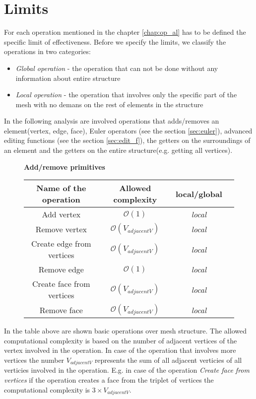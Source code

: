 \section{Limits}

For each operation mentioned in the chapter \ref{chap:op_al} has to be defined the specific limit
of effectiveness. Before we specify the limits, we classify the operations in two categories:

\begin{itemize}
\item \emph{Global operation} - the operation that can not be done without any information
about entire structure
\item \emph{Local operation} - the operation that involves only the specific part of the mesh
with no demans on the rest of elements in the structure
\end{itemize}
In the following analysis are involved operations that adds/removes an element(vertex, edge, face),
Euler operators (see the section \ref{sec:euler}), advanced editing functions (see the
section \ref{sec:edit_f}),
the getters on the surroundings of an element and the getters
on the entire structure(e.g. getting all vertices).

\begin{figure}[!hbf]

\centering
\textbf{Add/remove primitives}\\
\label{fig:comp_prim}
\vspace{2mm}
\begin{tabular}{| c | c | c | c |}
\hline
\textbf{Name of the operation} & \textbf{Allowed complexity} & \textbf{local/global}\\
\hline
Add vertex & $\mathcal{O}(1)$ & \emph{local}\\
\hline
Remove vertex & $\mathcal{O}(V_{adjacentV})$ & \emph{local}\\
\hline
Create edge from vertices& $\mathcal{O}(V_{adjacentV})$ & \emph{local}\\
\hline
Remove edge & $\mathcal{O}(1)$ & \emph{local}\\
\hline
Create face from vertices& $\mathcal{O}(V_{adjacentV})$ & \emph{local}\\
\hline
Remove face & $\mathcal{O}(V_{adjacentV})$ & \emph{local}\\
\hline
\end{tabular}
\end{figure}
In the table above are shown basic operations over mesh structure. The allowed
computational complexity is based on the number of adjacent vertices of the vertex involved
in the operation. In case of the operation that involves more vertices the number $V_{adjacentV}$
represents the sum of all adjacent verticies of all verticies involved in the operation.
E.g. in case of the operation \emph{Create face from vertices} if the operation creates a
face from the triplet of vertices the computational complexity is $3 \times V_{adjacentV}$.

